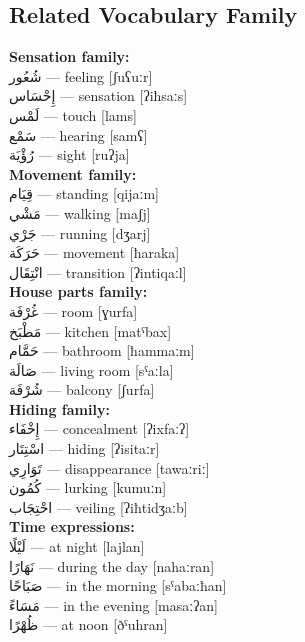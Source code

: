 \documentclass[letterpaper,12pt]{article}
\begin{document}
\subsection{Related Vocabulary Family}
\begin{multicols}{2}

\textbf{Sensation family:}\\
\textarabic{شُعُور} — feeling [ʃuʕuːr]\\
\textarabic{إِحْسَاس} — sensation [ʔiħsaːs]\\
\textarabic{لَمْس} — touch [lams]\\
\textarabic{سَمْع} — hearing [samʕ]\\
\textarabic{رُؤْيَة} — sight [ruʔja]\\

\textbf{Movement family:}\\
\textarabic{قِيَام} — standing [qijaːm]\\
\textarabic{مَشْي} — walking [maʃj]\\
\textarabic{جَرْي} — running [dʒarj]\\
\textarabic{حَرَكَة} — movement [ħaraka]\\
\textarabic{انْتِقَال} — transition [ʔintiqaːl]\\

\textbf{House parts family:}\\
\textarabic{غُرْفَة} — room [ɣurfa]\\
\textarabic{مَطْبَخ} — kitchen [matˤbax]\\
\textarabic{حَمَّام} — bathroom [ħammaːm]\\
\textarabic{صَالَة} — living room [sˤaːla]\\
\textarabic{شُرْفَة} — balcony [ʃurfa]\\

\textbf{Hiding family:}\\
\textarabic{إِخْفَاء} — concealment [ʔixfaːʔ]\\
\textarabic{اسْتِتَار} — hiding [ʔisitaːr]\\
\textarabic{تَوَارِي} — disappearance [tawaːriː]\\
\textarabic{كُمُون} — lurking [kumuːn]\\
\textarabic{احْتِجَاب} — veiling [ʔiħtidʒaːb]\\

\textbf{Time expressions:}\\
\textarabic{لَيْلًا} — at night [lajlan]\\
\textarabic{نَهَارًا} — during the day [nahaːran]\\
\textarabic{صَبَاحًا} — in the morning [sˤabaːħan]\\
\textarabic{مَسَاءً} — in the evening [masaːʔan]\\
\textarabic{ظُهْرًا} — at noon [ðˤuhran]\\


\end{multicols}
\end{document}
